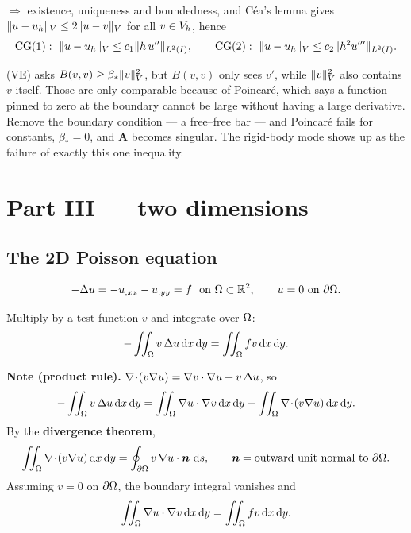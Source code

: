 \noindent
$\Rightarrow$ existence, uniqueness and boundedness, and C\'ea's lemma gives
$\lVert u-u_{h}\rVert_{V}\le2\lVert u-v\rVert_{V}$ for all $v\in V_{h}$, hence
\begin{equation}\label{eq:l13cgrates}
  \text{CG}(1):\ \lVert u-u_{h}\rVert_{V}\le c_{1}\lVert h\,u''\rVert_{L^{2}(I)},
  \qquad
  \text{CG}(2):\ \lVert u-u_{h}\rVert_{V}\le c_{2}\lVert h^{2}u'''\rVert_{L^{2}(I)} .
\end{equation}

\begin{intuition}
(VE) asks $B(v,v)\ge\beta_{*}\lVert v\rVert^{2}_{V}$, but $B(v,v)$ only sees
$v'$, while $\lVert v\rVert^{2}_{V}$ also contains $v$ itself. Those are only
comparable because of Poincar\'e, which says a function pinned to zero at the
boundary cannot be large without having a large derivative. Remove the boundary
condition --- a free--free bar --- and Poincar\'e fails for constants,
$\beta_{*}=0$, and $\bm{A}$ becomes singular. The rigid-body mode shows up as
the failure of exactly this one inequality.
\end{intuition}

\section*{Part III --- two dimensions}
\subsection*{The 2D Poisson equation}

\begin{equation}\label{eq:l132dpoisson}
  -\Delta u=-u_{,xx}-u_{,yy}=f \ \text{ on } \Omega\subset\mathbb{R}^{2},
  \qquad u=0 \text{ on } \partial\Omega .
\end{equation}

Multiply by a test function $v$ and integrate over $\Omega$:
\begin{equation}\label{eq:l132dmult}
  -\iint_{\Omega}v\,\Delta u\,\mathrm{d} x\,\mathrm{d} y=\iint_{\Omega}f v\,\mathrm{d} x\,\mathrm{d} y .
\end{equation}

\noindent
\textbf{Note (product rule).}
$\nabla\!\cdot\!(v\nabla u)=\nabla v\cdot\nabla u+v\,\Delta u$, so
\begin{equation}\label{eq:l132dprod}
  -\iint_{\Omega}v\,\Delta u\,\mathrm{d} x\,\mathrm{d} y
   =\iint_{\Omega}\nabla u\cdot\nabla v\,\mathrm{d} x\,\mathrm{d} y
   -\iint_{\Omega}\nabla\!\cdot\!(v\nabla u)\,\mathrm{d} x\,\mathrm{d} y .
\end{equation}
By the \textbf{divergence theorem},
\begin{equation}\label{eq:l13divthm}
  \iint_{\Omega}\nabla\!\cdot\!(v\nabla u)\,\mathrm{d} x\,\mathrm{d} y
   =\oint_{\partial\Omega}v\,\nabla u\cdot\bm{n}\,\,\mathrm{d} s,
  \qquad \bm{n}=\text{outward unit normal to } \partial\Omega .
\end{equation}
Assuming $v=0$ on $\partial\Omega$, the boundary integral vanishes and
\begin{equation}\label{eq:l132dweak}
  \iint_{\Omega}\nabla u\cdot\nabla v\,\mathrm{d} x\,\mathrm{d} y=\iint_{\Omega}f v\,\mathrm{d} x\,\mathrm{d} y .
\end{equation}

